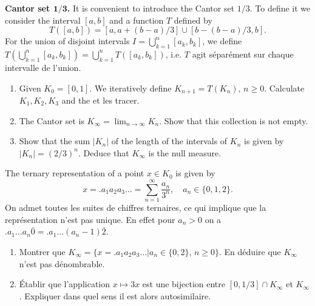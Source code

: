 \documentclass{article}
\begin{document}
   \begin{question}\textbf{Cantor set $\bm {1/3}$.}
     It is convenient to introduce the Cantor set $1/3$. To define it we consider the interval $[a,b]$ and a function $T$ defined by
   \begin{equation}
     T([a,b]) = [a,a+(b-a)/3]\cup [b-(b-a)/3,b].
   \end{equation}
    For the union of disjoint intervals $I = \bigcup_{k=1}^n[a_k,b_k]$, we define $T(\bigcup_{k=1}^n[a_k,b_k]) = \bigcup_{k=1}^nT([a_k,b_k])$, i.e. $T$ agit s\'epar\'ement sur chaque intervalle de l'union.
   
   
   \begin{enumerate}[label=(\alph*)]
     \item Given $K_0=[0,1]$. We iteratively define $K_{n+1} = T(K_n),\,n\geqslant 0$. Calculate $K_1,K_2,K_3$ and the et les tracer.
     \item The Cantor set is $K_\infty = \lim_{n\to \infty}K_n$. Show that this collection is not empty.
     \item Show that the sum $|K_n|$ of the length of the intervals of $K_n$ is given by $|K_n|=(2/3)^n$. Deduce that $K_\infty$ is the null measure.
   \end{enumerate}
    The ternary representation of a point $x\in K_0$ is given by
     \begin{equation}
       x = .a_1a_2a_3\dots = \sum_{n=1}^\infty \frac{a_n}{3^n}, \quad a_n \in \{0,1,2\}.
     \end{equation}
     On admet toutes les suites de chiffres ternaires, ce qui implique que la repr\'esentation n'est pas unique. En effet pour $a_n>0$ on a $.a_1\dots a_n\bar 0=.a_1\dots (a_n-1)\bar 2$.
   \begin{enumerate}[label=(\alph*),resume]
     \item Montrer que $K_\infty = \{x=.a_1a_2a_3\dots | a_n \in\{0,2\},\, n\geqslant 0\}$. En d\'eduire que $K_\infty$ n'est pas d\'enombrable.
        \item \'Etablir que l'application $x\mapsto 3x$ est une bijection entre $[0,1/3]\cap K_\infty$ et $K_\infty$. Expliquer dans quel sens il est alors autosimilaire.

        \end{enumerate}
   \end{question}
  
\end{document}
